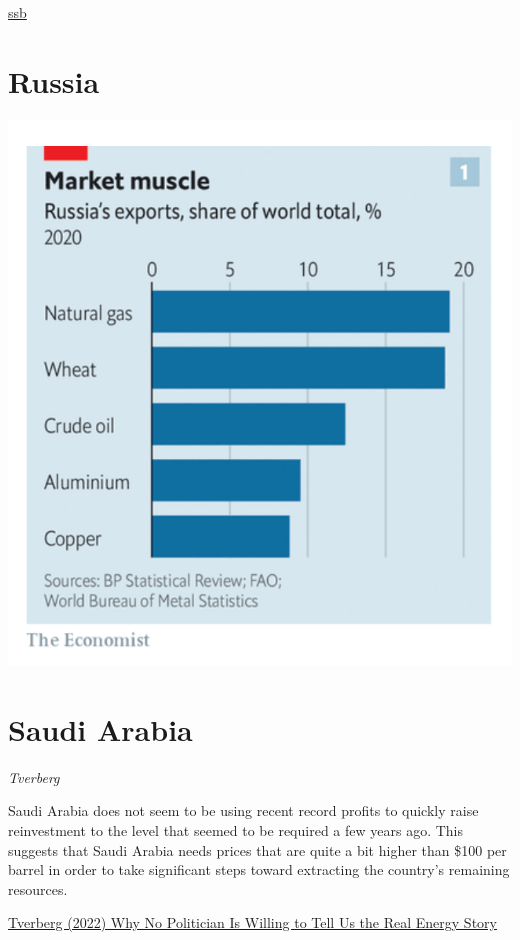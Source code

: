 \documentclass[
]{book}
\begin{document}
\href{https://www.ssb.no/statbank/table/09288/chartViewLine/}{ssb}

\hypertarget{russia}{%
\section{Russia}\label{russia}}

\includegraphics{fig/russia_share_of_world_exports.png}

\hypertarget{saudi-arabia}{%
\section{Saudi Arabia}\label{saudi-arabia}}

\emph{Tverberg}

Saudi Arabia does not seem to be using recent record profits to quickly raise reinvestment to the level that seemed to be required a few years ago. This suggests that Saudi Arabia needs prices that are quite a bit higher than \$100 per barrel in order to take significant steps toward extracting the country's remaining resources.

\href{https://ourfiniteworld.com/2022/08/23/why-no-politician-is-willing-to-tell-us-the-real-energy-story/}{Tverberg (2022) Why No Politician Is Willing to Tell Us the Real Energy Story}
\end{document}
